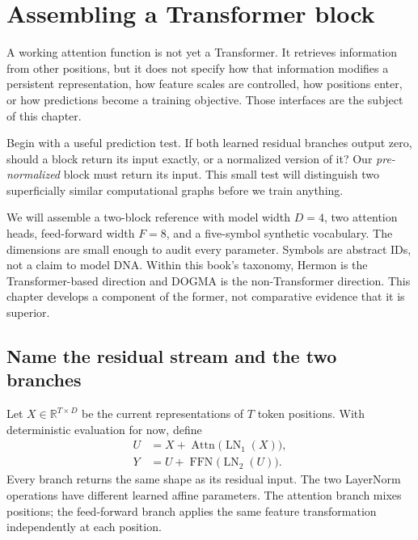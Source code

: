 \chapter{Assembling a Transformer block}
\label{ch:block}

A working attention function is not yet a Transformer. It retrieves information from other positions, but it does not specify how that information modifies a persistent representation, how feature scales are controlled, how positions enter, or how predictions become a training objective. Those interfaces are the subject of this chapter.

Begin with a useful prediction test. If both learned residual branches output zero, should a block return its input exactly, or a normalized version of it? Our \emph{pre-normalized} block must return its input. This small test will distinguish two superficially similar computational graphs before we train anything.

We will assemble a two-block reference with model width $D=4$, two attention heads, feed-forward width $F=8$, and a five-symbol synthetic vocabulary. The dimensions are small enough to audit every parameter. Symbols are abstract IDs, not a claim to model DNA. Within this book's taxonomy, Hermon is the Transformer-based direction and DOGMA is the non-Transformer direction. This chapter develops a component of the former, not comparative evidence that it is superior.

\section{Name the residual stream and the two branches}
Let $X\in\mathbb R^{T\times D}$ be the current representations of $T$ token positions. With deterministic evaluation for now, define
\begin{align}
U&=X+\operatorname{Attn}\bigl(\operatorname{LN}_1(X)\bigr),\\
Y&=U+\operatorname{FFN}\bigl(\operatorname{LN}_2(U)\bigr). \label{eq:block}
\end{align}
Every branch returns the same shape as its residual input. The two LayerNorm operations have different learned affine parameters. The attention branch mixes positions; the feed-forward branch applies the same feature transformation independently at each position.


